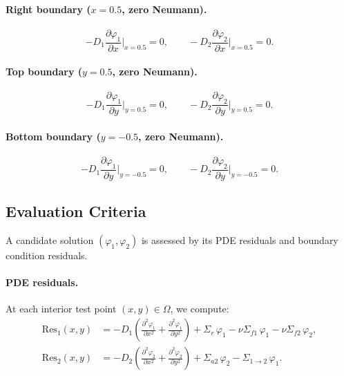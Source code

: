 \paragraph{Right boundary ($x = 0.5$, zero Neumann).}
\begin{equation}
\label{eq:bc_right}
-D_1 \frac{\partial \varphi_1}{\partial x}\bigg|_{x=0.5} = 0,
\qquad
-D_2 \frac{\partial \varphi_2}{\partial x}\bigg|_{x=0.5} = 0.
\end{equation}

\paragraph{Top boundary ($y = 0.5$, zero Neumann).}
\begin{equation}
\label{eq:bc_top}
-D_1 \frac{\partial \varphi_1}{\partial y}\bigg|_{y=0.5} = 0,
\qquad
-D_2 \frac{\partial \varphi_2}{\partial y}\bigg|_{y=0.5} = 0.
\end{equation}

\paragraph{Bottom boundary ($y = -0.5$, zero Neumann).}
\begin{equation}
\label{eq:bc_bottom}
-D_1 \frac{\partial \varphi_1}{\partial y}\bigg|_{y=-0.5} = 0,
\qquad
-D_2 \frac{\partial \varphi_2}{\partial y}\bigg|_{y=-0.5} = 0.
\end{equation}

\subsection{Evaluation Criteria}
\label{sec:evaluation}

A candidate solution $(\varphi_1, \varphi_2)$ is assessed by its PDE residuals and boundary condition residuals.

\paragraph{PDE residuals.}
At each interior test point $(x, y) \in \Omega$, we compute:
\begin{align}
\label{eq:res_fast}
\mathrm{Res}_1(x,y) &= -D_1 \left(\frac{\partial^2 \varphi_1}{\partial x^2} + \frac{\partial^2 \varphi_1}{\partial y^2}\right) + \Sigma_r \, \varphi_1 - \nu \Sigma_{f1} \, \varphi_1 - \nu \Sigma_{f2} \, \varphi_2, \\
\label{eq:res_thermal}
\mathrm{Res}_2(x,y) &= -D_2 \left(\frac{\partial^2 \varphi_2}{\partial x^2} + \frac{\partial^2 \varphi_2}{\partial y^2}\right) + \Sigma_{a2} \, \varphi_2 - \Sigma_{1\to2} \, \varphi_1.
\end{align}

